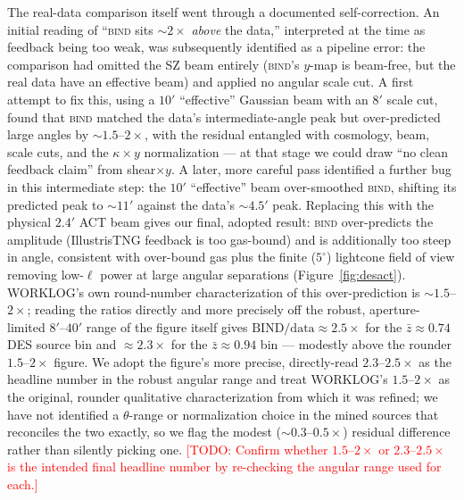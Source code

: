 \documentclass[11pt]{article}
\newcommand{\bind}{\textsc{bind}}
\newcommand{\kappay}{\kappa\times y}
\newcommand{\todo}[1]{\textcolor{red}{[TODO: #1]}}
\begin{document}
The real-data comparison itself went through a documented self-correction.
An initial reading of ``\bind{} sits $\sim2\times$ \emph{above} the data,''
interpreted at the time as feedback being too weak, was subsequently
identified as a pipeline error: the comparison had omitted the SZ beam
entirely (\bind{}'s $y$-map is beam-free, but the real data have an
effective beam) and applied no angular scale cut. %
A first attempt to fix this, using a $10'$ ``effective'' Gaussian beam
with an $8'$ scale cut, found that \bind{} matched the data's
intermediate-angle peak but over-predicted large angles by
$\sim\!1.5$–$2\times$, with the residual entangled with cosmology, beam,
scale cuts, and the $\kappay$ normalization — at that stage we could draw
``no clean feedback claim'' from shear$\times y$. %
A later, more careful pass identified a further bug in this intermediate
step: the $10'$ ``effective'' beam over-smoothed \bind{}, shifting its
predicted peak to $\sim\!11'$ against the data's $\sim\!4.5'$ peak. %
Replacing this with the physical $2.4'$ ACT beam gives our final,
adopted result: \bind{} over-predicts the amplitude
(IllustrisTNG feedback is too gas-bound) and is additionally too steep in
angle, consistent with over-bound gas plus the finite ($5^\circ$)
lightcone field of view removing low-$\ell$ power at large angular
separations (Figure~\ref{fig:desact}). %
WORKLOG's own round-number characterization of this over-prediction is
$\sim\!1.5$–$2\times$; reading the ratios directly and more precisely off
the robust, aperture-limited $8'$–$40'$ range of the figure itself gives
$\mathrm{BIND}/\mathrm{data}\approx2.5\times$ for
the $\bar z\approx0.74$ DES source bin and $\approx2.3\times$ for the
$\bar z\approx0.94$ bin — modestly above the rounder $1.5$–$2\times$
figure. %
We adopt the figure's more precise, directly-read $2.3$–$2.5\times$ as the
headline number in the robust angular range and treat WORKLOG's
$1.5$–$2\times$ as the original, rounder qualitative characterization from
which it was refined; we have not identified a $\theta$-range or
normalization choice in the mined sources that reconciles the two exactly,
so we flag the modest ($\sim\!0.3$–$0.5\times$) residual difference rather
than silently picking one. \todo{Confirm whether $1.5$–$2\times$ or
$2.3$–$2.5\times$ is the intended final headline number by re-checking the
angular range used for each.}
\end{document}
